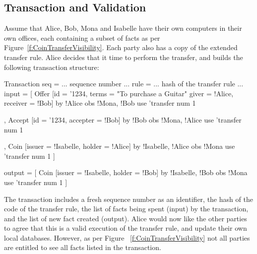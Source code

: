 

\subsection{Transaction and Validation}
\label{s:Transactions}
Assume that Alice, Bob, Mona and Isabelle have their own computers in their own offices, each containing a subset of facts as per Figure~\ref{f:CoinTransferVisibility}. Each party also has a copy of the extended transfer rule. Alice decides that it time to perform the transfer, and builds the following transaction structure:

\begin{small}
\begin{code}
Transaction
 seq    = ... sequence number ...
 rule   = ... hash of the transfer rule ...
 input  = [ Offer [id = '1234, terms = "To purchase a Guitar"
                  giver = !Alice, receiver = !Bob]
            by  {!Alice}            obs {!Mona, !Bob}
            use {'transfer}         num  1

          , Accept [id = '1234, accepter = !Bob]
            by  {!Bob}              obs {!Mona, !Alice}
            use {'transfer}         num 1

          , Coin   [issuer = !Isabelle, holder = !Alice]
            by  {!Isabelle, !Alice} obs {!Mona}
            use {'transfer}         num 1 ]

 output = [ Coin   [issuer = !Isabelle, holder = !Bob]
            by  {!Isabelle, !Bob}   obs {!Mona}
            use {'transfer}         num 1 ]
\end{code}
\end{small}

The transaction includes a fresh sequence number as an identifier, the hash of the code of the transfer rule, the list of facts being spent (input) by the transaction, and the list of new fact created (output). Alice would now like the other parties to agree that this is a valid execution of the transfer rule, and update their own local databases. However, as per Figure ~\ref{f:CoinTransferVisibility} not all parties are entitled to see all facts listed in the transaction.


